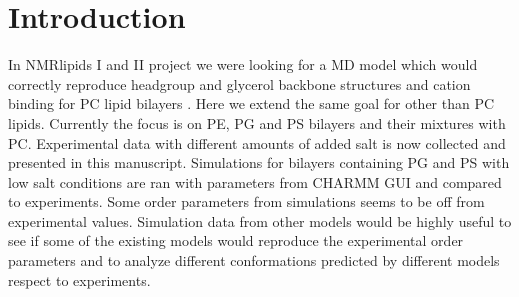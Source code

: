 \documentclass[aps,prl,superscriptaddress,twocolumn]{revtex4}
\begin{document}
\section{Introduction}

In NMRlipids I and II project we were looking for a MD model
which would correctly reproduce headgroup and glycerol
backbone structures and cation binding for PC lipid bilayers \cite{botan15,catte16}.
Here we extend the same goal for other than PC lipids.
Currently the focus is on PE, PG and PS bilayers and their
mixtures with PC. Experimental data with different amounts of 
added salt is now collected and presented in this manuscript.
Simulations for bilayers containing PG and PS with low salt conditions
are ran with parameters from CHARMM GUI
and compared to experiments. Some order parameters from
simulations seems to be off from experimental values.
Simulation data from other models would be highly useful 
to see if some of the existing models would reproduce the 
experimental order parameters and to analyze different 
conformations predicted by different models respect to 
experiments.



\end{document}
